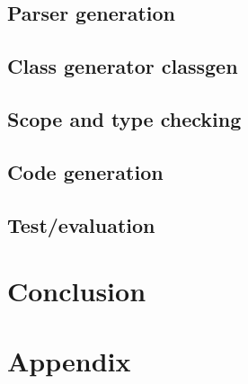 	\section{Parser generation}
	\section{Class generator classgen}
	\section{Scope and type checking}
	\section{Code generation}

\renewcommand{\ind}[1]{}
\section{Test/evaluation}

\renewcommand{\ind}[1]{}
\chapter{Conclusion}



\begingroup
	\raggedright
	{}	%
\endgroup


\newpage
\listoffixmes	%

\clearforchapter
\chapter{Appendix}
\appendix	%


\renewcommand{\ind}[1]{}

